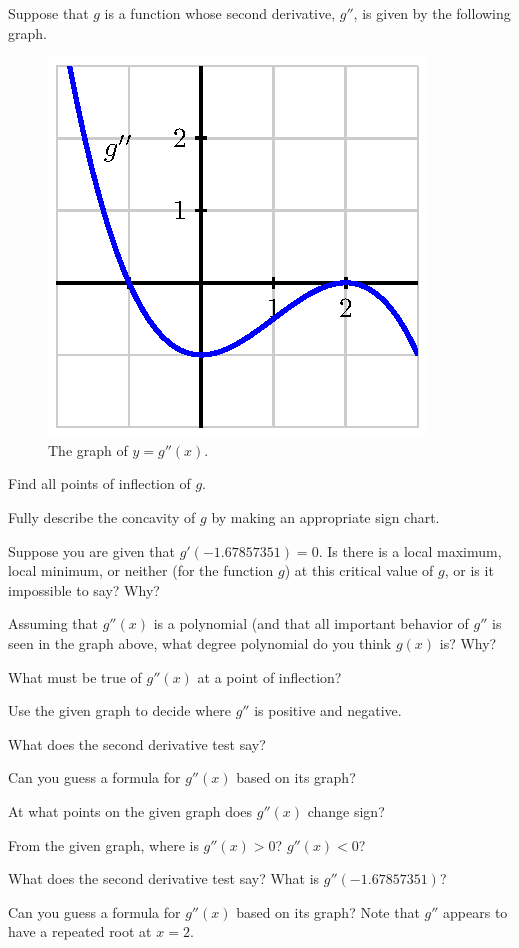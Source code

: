 \begin{activity} \label{A:3.1.2}  Suppose that $g$ is a function whose second derivative, $g''$, is given by the following graph.
\begin{figure}[h]
\hfil
\includegraphics{figures/3_1_Act2.eps} 
\hfil
\caption{The graph of $y = g''(x)$.} \label{F:3.1.Act2}
\end{figure}
\ba 
  \item Find all points of inflection of $g$. 
  \item Fully describe the concavity of $g$ by making an appropriate sign chart.  
  \item Suppose you are given that $g'(-1.67857351) = 0$.  Is there is a local maximum, local minimum, or neither (for the function $g$) at this critical value of $g$, or is it impossible to say?  Why?
  \item Assuming that $g''(x)$ is a polynomial (and that all important behavior of $g''$ is seen in the graph above, what degree polynomial do you think $g(x)$ is?  Why?
\ea
\end{activity}
\begin{smallhint}
\ba 
  \item What must be true of $g''(x)$ at a point of inflection?
  \item Use the given graph to decide where $g''$ is positive and negative.
  \item What does the second derivative test say?
  \item Can you guess a formula for $g''(x)$ based on its graph?
\ea
\end{smallhint}
\begin{bighint}
\ba 
  \item At what points on the given graph does $g''(x)$ change sign?
  \item From the given graph, where is $g''(x) > 0$?  $g''(x) < 0$?
  \item What does the second derivative test say?  What is $g''(-1.67857351)$?
  \item Can you guess a formula for $g''(x)$ based on its graph?  Note that $g''$ appears to have a repeated root at $x = 2$.
\ea
\end{bighint}
